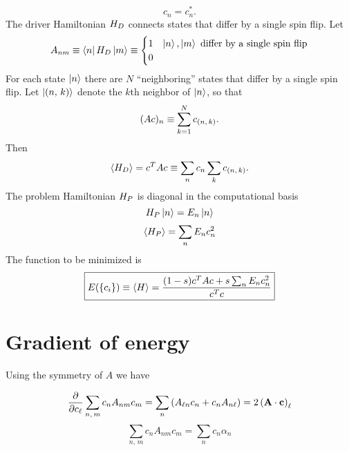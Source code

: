 \begin{equation}
  c_n = c_n^*.
  \label{}
\end{equation}
The driver Hamiltonian $H_D$ connects states that differ by a single spin
flip. Let
\begin{equation}
  A_{n m}
  \equiv \matrixel{n}{\ham_D}{m}
  \equiv \begin{cases}
    1 & \ket{n}, \ket{m} \text{ differ by a single spin flip} \\
    0
  \end{cases}
  \label{}
\end{equation}
For each state $\left| n \right>$ there are $N$ ``neighboring'' states that differ by a
single spin flip. Let $\left| (n,\,k) \right>$ denote the $k$th neighbor of
$\left| n \right>$, so that
\begin{equation}
  (A c)_n \equiv \sum_{k=1}^N c_{(n,\,k)}.
  \label{}
\end{equation}
Then
\begin{equation}
  \left< H_D \right>
  = c^T A c
  \equiv \sum_n c_n \sum_k c_{(n,\,k)}.
  \label{}
\end{equation}
The problem Hamiltonian $H_P$ is diagonal in the computational basis
\begin{equation}
  H_P \left| n \right> = E_n \left| n \right>
  \label{}
\end{equation}
\begin{equation}
  \left< H_P \right> = \sum_n E_n c_n^2
  \label{}
\end{equation}
The function to be minimized is
\begin{equation}
  \boxed{
  E( \{ c_i \})
  \equiv \left< H \right>
  = \frac{(1-s) c^T A c + s \sum_n E_n c_n^2}{c^T c}
  }
  \label{}
\end{equation}
\section*{Gradient of energy}
Using the symmetry of $A$ we have

\begin{equation}
  \frac{\partial }{\partial c_{\ell}} \sum_{n,\,m} c_n A_{n m} c_m
  = \sum_n \left( A_{\ell n} c_n + c_n A_{n \ell} \right)
  = 2 \left( \mathbf{A} \cdot \mathbf{c} \right)_{\ell}
  \label{}
\end{equation}
\begin{equation}
  \sum_{n,\,m} c_n A_{n m} c_m = \sum_n c_n \alpha_n
  \label{}
\end{equation}



